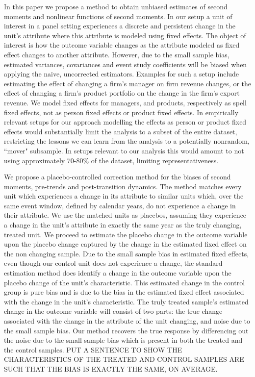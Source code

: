 \documentclass[11pt,a4paper]{article}
\begin{document}
In this paper we propose a method to obtain unbiased estimates of second moments and nonlinear functions of second moments. In our setup a unit of interest in a panel setting experiences a discrete and persistent change in the unit's attribute where this attribute is modeled using fixed effects. The object of interest is how the outcome variable changes as the attribute modeled as fixed effect changes to another attribute. However, due to the small sample bias, estimated variances, covariances and event study coefficients will be biased when applying the naive, uncorrected estimators. Examples for such a setup include estimating the effect of changing a firm's manager on firm revenue changes, or the effect of changing a firm's product portfolio on the change in the firm's export revenue. We model fixed effects for managers, and products, respectively as spell fixed effects, not as person fixed effects or product fixed effects. In empirically relevant setups for our approach modelling the effects as person or product fixed effects would substantially limit the analysis to a subset of the entire dataset, restricting the lessons we can learn from the analysis to a potentially nonrandom, ``mover" subsample. In setups relevant to our analysis this would amount to not using approximately 70-80\% of the dataset, limiting representativeness.

We propose a placebo-controlled correction method for the biases of second moments, pre-trends and post-transition dynamics. The method matches every unit which experiences a change in its attribute to similar units which, over the same event window, defined by calendar years, do not experience a change in their attribute. We use the matched units as placebos, assuming they experience a change in the unit's attribute in exactly the same year as the truly changing, treated unit. We proceed to estimate the placebo change in the outcome variable upon the placebo change captured by the change in the estimated fixed effect on the non changing sample. Due to the small sample bias in estimated fixed effects, even though our control unit does not experience a change, the standard estimation method does identify a change in the outcome variable upon the placebo change of the unit's characteristic. This estimated change in the control group is pure bias and is due to the bias in the estimated fixed effect associated with the change in the unit's characteristic. The truly treated sample's estimated change in the outcome variable will consist of two parts: the true change associated with the change in the attribute of the unit changing, and noise due to the small sample bias. Our method recovers the true response by differencing out the noise due to the small sample bias which is present in both the treated and the control samples. PUT A SENTENCE TO SHOW THE CHARACTERISTICS OF THE TREATED AND CONTROL SAMPLES ARE SUCH THAT THE BIAS IS EXACTLY THE SAME, ON AVERAGE.
\end{document}
